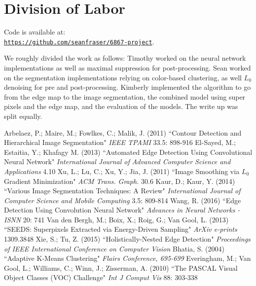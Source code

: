 \documentclass[10pt, twocolumn, twoside]{article}
\begin{document}
\section{Division of Labor}

Code is available at: \\
\href{https://github.com/seanfraser/6867-project}{\texttt{https://github.com/seanfraser/6867-project}}.

We roughly divided the work as follows: 
Timothy worked on the neural network implementations as well as maximal suppression for post-processing. Sean worked on the segmentation implementations relying on color-based clustering, as well $L_0$ denoising for pre and post-processing. Kimberly implemented the algorithm to go from the edge map to the image segmentation, the combined model using super pixels and the edge map, and the evaluation of the models. The write up was split equally.

\newpage
\begin{thebibliography}{9}
Arbelaez, P.; Maire, M.; Fowlkes, C.; Malik, J. (2011)
``Contour Detection and Hierarchical Image Segmentation"
\textit{IEEE TPAMI} 33.5: 898-916
El-Sayed, M.; Estaitia, Y.; Khafagy M. (2013)
``Automated Edge Detection Using Convolutional
Neural Network"
\textit{International Journal of Advanced Computer Science and Applications} 4.10
Xu, L.; Lu, C.; Xu, Y.; Jia, J. (2011)
``Image Smoothing via $L_0$
 Gradient Minimization"
\textit{ACM Trans. Graph.} 30.6
Kaur, D.; Kaur, Y. (2014)
``Various Image Segmentation
Techniques: A Review"
\textit{International Journal of Computer Science and Mobile Computing} 3.5: 809-814
Wang, R. (2016)
``Edge Detection Using Convolution Neural Network"
\textit{Advances in Neural Networks - ISNN} 20: 741
Van den Bergh, M.; Boix, X.; Roig, G.; Van Gool, L.  (2013)
``SEEDS: Superpixels Extracted via Energy-Driven Sampling"
\textit{ArXiv e-prints} 1309.3848
Xie, S.; Tu, Z. (2015)
``Holistically-Nested Edge Detection"
\textit{Proceedings of IEEE International Conference on Computer Vision}
Bhatia, S. (2004)
``Adaptive K-Means Clustering"
\textit{Flairs Conference, 695-699}
Everingham, M.; Van Gool, L.; Williams, C.; Winn, J.; Zisserman, A. (2010)
``The PASCAL Visual Object Classes (VOC) Challenge"
\textit{Int J Comput Vis} 88: 303-338

\end{thebibliography}
\end{document}
